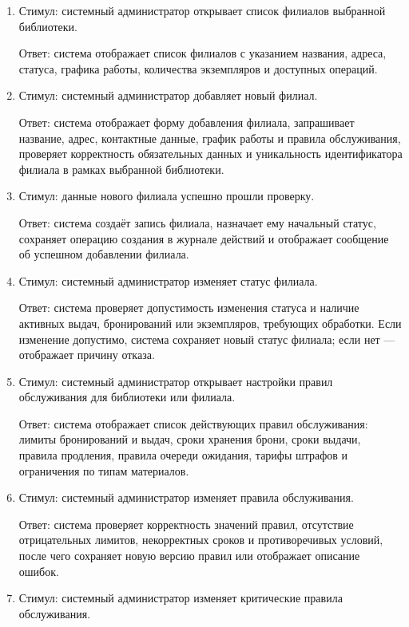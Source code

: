\documentclass[12pt,a4paper]{article}
\begin{document}
\begin{enumerate}
		\item Стимул: системный администратор открывает список филиалов выбранной
		библиотеки.
		
		Ответ: система отображает список филиалов с указанием названия, адреса,
		статуса, графика работы, количества экземпляров и доступных операций.
		
		\item Стимул: системный администратор добавляет новый филиал.
		
		Ответ: система отображает форму добавления филиала, запрашивает название,
		адрес, контактные данные, график работы и правила обслуживания, проверяет
		корректность обязательных данных и уникальность идентификатора филиала
		в рамках выбранной библиотеки.
		
		\item Стимул: данные нового филиала успешно прошли проверку.
		
		Ответ: система создаёт запись филиала, назначает ему начальный статус,
		сохраняет операцию создания в журнале действий и отображает сообщение
		об успешном добавлении филиала.
		
		\item Стимул: системный администратор изменяет статус филиала.
		
		Ответ: система проверяет допустимость изменения статуса и наличие активных
		выдач, бронирований или экземпляров, требующих обработки. Если изменение
		допустимо, система сохраняет новый статус филиала; если нет — отображает
		причину отказа.
		
		\item Стимул: системный администратор открывает настройки правил обслуживания
		для библиотеки или филиала.
		
		Ответ: система отображает список действующих правил обслуживания: лимиты
		бронирований и выдач, сроки хранения брони, сроки выдачи, правила продления,
		правила очереди ожидания, тарифы штрафов и ограничения по типам материалов.
		
		\item Стимул: системный администратор изменяет правила обслуживания.
		
		Ответ: система проверяет корректность значений правил, отсутствие отрицательных
		лимитов, некорректных сроков и противоречивых условий, после чего сохраняет
		новую версию правил или отображает описание ошибок.
		
		\item Стимул: системный администратор изменяет критические правила обслуживания.
		

\end{enumerate}
\end{document}
